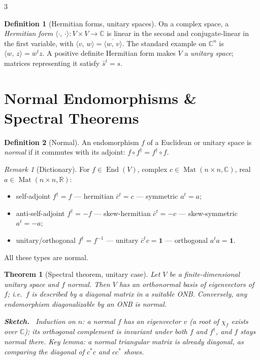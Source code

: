\documentclass[10pt,a4paper,landscape]{article}
\theoremstyle{definition}
\newtheorem{defn}{Definition}[section]
\theoremstyle{plain}
\newtheorem{thm}{Theorem}[section]
\theoremstyle{remark}
\newtheorem{rem}{Remark}[section]
\newcommand{\R}{\mathbb{R}}
\newcommand{\C}{\mathbb{C}}
\newcommand{\comp}{\circ}
\DeclareMathOperator{\End}{End}
\DeclareMathOperator{\Mat}{Mat}
\newcommand{\ip}[2]{\langle #1,\, #2 \rangle}
\newcommand{\one}{\mathbf{1}}
\newcommand{\Char}{\chi}
\newenvironment{proofsketch}{%
  \par\small\color{exgray}\textbf{Sketch.}\ }%
  {\par}
\begin{document}
\begin{multicols*}{3}
\begin{defn}[Hermitian forms, unitary spaces]
On a complex space, a \emph{Hermitian form} $\ip{\cdot}{\cdot}: V \times V \to \C$ is linear in the second and conjugate-linear in the first variable, with $\ip{v}{w} = \overline{\ip{w}{v}}$. The standard example on $\C^n$ is $\ip{w}{z} = \overline{w}^{t} z$. A positive definite Hermitian form makes $V$ a \emph{unitary space}; matrices representing it satisfy $\bar s^t = s$.
\end{defn}

\section{Normal Endomorphisms \& Spectral Theorems}

\begin{defn}[Normal]
An endomorphism $f$ of a Euclidean or unitary space is \emph{normal} if it commutes with its adjoint: $f \comp f^{\dagger} = f^{\dagger} \comp f$.
\end{defn}

\begin{rem}[Dictionary]
For $f \in \End(V)$, complex $c \in \Mat(n \times n, \C)$, real $a \in \Mat(n \times n, \R)$:
\begin{itemize}
\item self-adjoint $f^{\dagger} = f$ --- hermitian $\bar c^t = c$ --- symmetric $a^t = a$;
\item anti-self-adjoint $f^{\dagger} = -f$ --- skew-hermitian $\bar c^t = -c$ --- skew-symmetric $a^t = -a$;
\item unitary/orthogonal $f^{\dagger} = f^{-1}$ --- unitary $\bar c^t c = \one$ --- orthogonal $a^t a = \one$.
\end{itemize}
All these types are normal.
\end{rem}

\begin{thm}[Spectral theorem, unitary case]
Let $V$ be a finite-dimensional unitary space and $f$ normal. Then $V$ has an orthonormal basis of eigenvectors of $f$; i.e.\ $f$ is described by a diagonal matrix in a suitable ONB. Conversely, any endomorphism diagonalizable by an ONB is normal.
\begin{proofsketch}
Induction on $n$: a normal $f$ has an eigenvector $v$ (a root of $\Char_f$ exists over $\C$); its orthogonal complement is invariant under both $f$ and $f^{\dagger}$, and $f$ stays normal there. Key lemma: a normal \emph{triangular} matrix is already diagonal, as comparing the diagonal of $c^*c$ and $cc^*$ shows.
\end{proofsketch}
\end{thm}


\end{multicols*}
\end{document}
